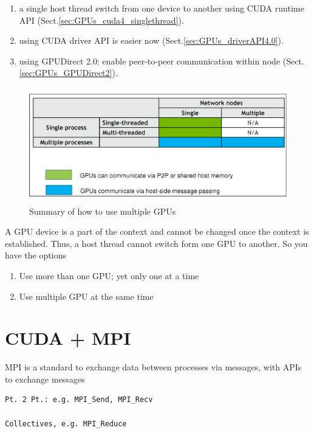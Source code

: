 \begin{itemize}
\begin{enumerate}

  \item a single host thread switch
  from one device to another using CUDA
  runtime API (Sect.\ref{sec:GPUs_cuda4_singlethread}).
  
  \item using CUDA driver API is easier now (Sect.\ref{sec:GPUs_driverAPI4.0}).
  
  \item using GPUDirect 2.0: enable peer-to-peer communication within node
  (Sect.\ref{sec:GPUs_GPUDirect2}).
\end{enumerate}

\end{itemize}

\begin{figure}[hbt]
  \centerline{\includegraphics[height=5cm,
    angle=0]{./images/multipleGPU.eps}}
\caption{Summary of how to use multiple GPUs}
\label{fig:case_multipleGPU}
\end{figure}
 
A GPU device is a part of the context and cannot be changed once the context is
established. Thus, a host thread cannot switch form one GPU to another. So you
have the options
\begin{enumerate}
\item Use more than one GPU; yet only one at a time
\item Use multiple GPU at the same time
\end{enumerate}


\section{CUDA + MPI}
\label{sec:CUDA-MPI}

MPI is a standard to exchange data between processes via messages, with APIs 
to exchange messages
\begin{verbatim}
Pt. 2 Pt.: e.g. MPI_Send, MPI_Recv

Collectives, e.g. MPI_Reduce
\end{verbatim}

